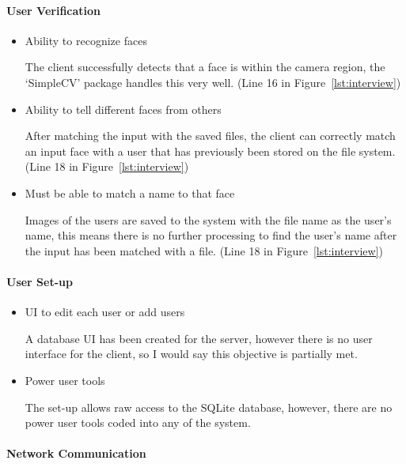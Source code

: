 \documentclass[12pt,a4paper]{report}
\newcounter{Figure}
\begin{document}
		\paragraph{User Verification}
			\begin{itemize}
				\item Ability to recognize faces

				The client successfully detects that a face is within the camera region, the `SimpleCV' package
				handles this very well. (Line 16 in Figure~\ref{lst:interview})

				\item Ability to tell different faces from others
				
				After matching the input with the saved files, the client can correctly match an input face with a
				user that has previously been stored on the file system. (Line 18 in Figure~\ref{lst:interview})

				\item Must be able to match a name to that face

				Images of the users are saved to the system with the file name as the user's name, this means there is
				no further processing to find the user's name after the input has been matched with a file. (Line 18 in Figure~\ref{lst:interview})
			\end{itemize}

		\paragraph{User Set-up}

			\begin{itemize}
				\item UI to edit each user or add users

				A database UI has been created for the server, however there is no user interface for the client, so I would
				say this objective is partially met.
				
				\item Power user tools

				The set-up allows raw access to the SQLite database, however, there are no power user tools coded into any of
				the system.
			\end{itemize}

		\paragraph{Network Communication}
		
\end{document}
